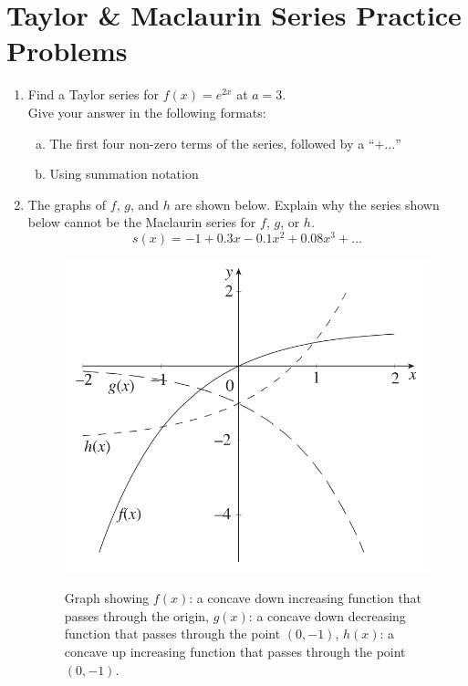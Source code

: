 \section*{Taylor \& Maclaurin Series Practice Problems}

\begin{enumerate}
\item Find a Taylor series for \(f(x) = e^{2x}\) at \(a=3\).\\
Give your answer in the following formats:

\begin{enumerate}[(a)]

\item The first four non-zero terms of the series, followed by a ``\(+\ldots\)''

\item Using summation notation

\end{enumerate}

\vfill



\item The graphs of \(f\), \(g\), and \(h\) are shown below. Explain why the series shown below cannot be the Maclaurin series for \(f\), \(g\), or \(h\).
\[
s(x) = -1+0.3 x - 0.1x^2+0.08x^3+\ldots
\]

\begin{figure}[h]
\includegraphics{Ch8s7-ws2-prob3.png}
\caption{}
Graph showing \(f(x)\): a concave down increasing function that passes through the origin, \(g(x)\): a concave down decreasing function that passes through the point \((0,-1)\), \(h(x)\): a concave up increasing function that passes through the point \((0,-1)\).%
\end{figure}



\end{enumerate}

